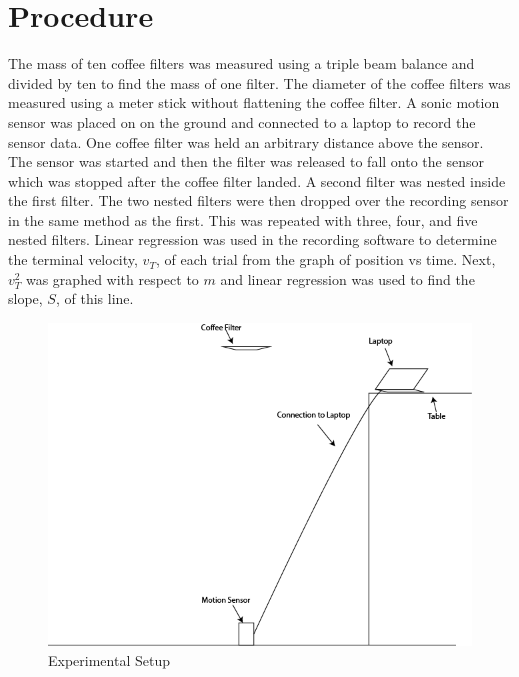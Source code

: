 \documentclass[12pt]{article}
\begin{document}
    \section{Procedure}
        The mass of ten coffee filters was measured using a triple beam balance and divided by ten to find the mass of one filter. The diameter of the coffee filters was measured using a meter stick without flattening the coffee filter. A sonic motion sensor was placed on on the ground and connected to a laptop to record the sensor data. One coffee filter was held an arbitrary distance above the sensor. The sensor was started and then the filter was released to fall onto the sensor which was stopped after the coffee filter landed. A second filter was nested inside the first filter. The two nested filters were then dropped over the recording sensor in the same method as the first. This was repeated with three, four, and five nested filters. Linear regression was used in the recording software to determine the terminal velocity, $v_T$, of each trial from the graph of position vs time. Next, \(v_T^2\) was graphed with respect to \(m\) and linear regression was used to find the slope, \(S\), of this line.
    \begin{figure}[H]
        \caption{Experimental Setup}
        \includegraphics[width=\linewidth]{Setup.png}
    \end{figure}
\end{document}
